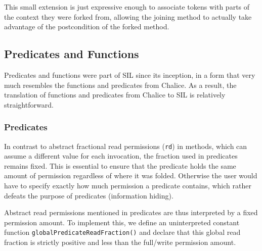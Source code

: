 This small extension is just expressive enough to associate tokens with parts of the context they were forked from, allowing the joining method to actually take advantage of the postcondition of the forked method.

\subsection{Predicates and Functions}\label{sct:pf}
Predicates and functions were part of SIL since its inception, in a form that very much resembles the functions and predicates from Chalice. 
As a result, the translation of functions and predicates from Chalice to SIL is relatively straightforward. 

\subsubsection{Predicates}

In contrast to abstract fractional read permissions (\lstinline[language=Chalice]!rd!) in methods, which can assume a different value for each invocation, the fraction used in predicates remains fixed. 
This is essential to ensure that the predicate holds the same amount of permission regardless of where it was folded. 
Otherwise the user would have to specify exactly how much permission a predicate contains, which rather defeats the purpose of predicates (information hiding).

Abstract read permissions mentioned in predicates are thus interpreted by a fixed permission amount.
To implement this, we define an uninterpreted constant function \lstinline[language=SIL]!globalPredicateReadFraction()! and declare that this global read fraction is strictly positive and less than the full/write permission amount.

